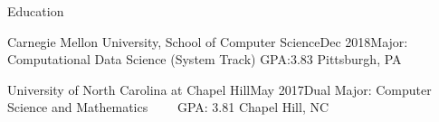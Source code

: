 \documentclass{resume} %
\begin{document}

\begin{rSection}{Education}

\begin{rEducation}{Carnegie Mellon University, School of Computer Science}{Dec 2018}{Major: Computational Data Science (System Track) GPA:3.83}
    {Pittsburgh, PA}
\end{rEducation}
\begin{rEducation}{University of North Carolina at Chapel Hill}{May 2017}{Dual Major: Computer Science and Mathematics \ \ \ \  GPA: 3.81}
    {Chapel Hill, NC}
\end{rEducation}
\end{rSection}

\end{document}
